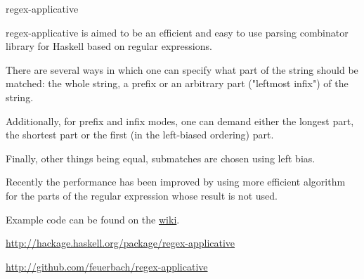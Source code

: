 \begin{hcarentry}[new]{regex-applicative}
\makeheader

regex-applicative is aimed to be an efficient and easy to use parsing combinator
library for Haskell based on regular expressions.

There are several ways in which one can specify what part of the string should
be matched: the whole string, a prefix or an arbitrary part ("leftmost infix")
of the string.

Additionally, for prefix and infix modes, one can demand either
the longest part, the shortest part or the first (in the left-biased ordering)
part.

Finally, other things being equal, submatches are chosen using left bias.

Recently the performance has been improved by using more efficient algorithm for
the parts of the regular expression whose result is not used.

\noindent
Example code can be found on the
\href{https://github.com/feuerbach/regex-applicative/wiki/Examples}
{wiki}.

\FurtherReading
\begin{compactitem}
  \item \url{http://hackage.haskell.org/package/regex-applicative}
  \item \url{http://github.com/feuerbach/regex-applicative}
\end{compactitem}
\end{hcarentry}
